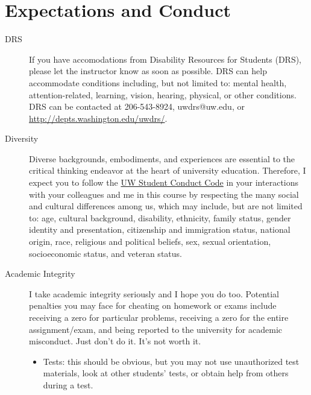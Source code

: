 \documentclass{article}
\begin{document}
\section{Expectations and Conduct}
\label{sec:orge26f9c3}
\begin{description}
\item[{DRS}] If you have accomodations from Disability Resources for Students (DRS), please let the instructor know as soon as possible. DRS can help accommodate conditions including, but not limited to: mental health, attention-related, learning, vision, hearing, physical, or other conditions. DRS can be contacted at 206-543-8924, uwdrs@uw.edu, or \url{http://depts.washington.edu/uwdrs/}.

\item[{Diversity}] Diverse backgrounds, embodiments, and experiences are essential to the critical thinking endeavor at the heart of university education. Therefore, I expect you to follow the \href{https://www.washington.edu/cssc/for-students/student-code-of-conduct/}{UW Student Conduct Code} in your interactions with your colleagues and me in this course by respecting the many social and cultural
differences among us, which may include, but are not limited to: age, cultural background, disability, ethnicity, family status, gender identity and presentation, citizenship and immigration status, national origin, race, religious and political beliefs, sex, sexual orientation, socioeconomic status, and veteran status.

\item[{Academic Integrity}] I take academic integrity seriously and I hope you do too. Potential penalties you may face for cheating on homework or exams include receiving a zero for particular problems, receiving a zero for the entire assignment/exam, and being reported to the university for academic misconduct. Just don't do it. It's not worth it.

\begin{itemize}
\item Tests: this should be obvious, but you may not use unauthorized test materials, look at other students' tests, or obtain help from others during a test.


\end{itemize}
\end{description}
\end{document}
